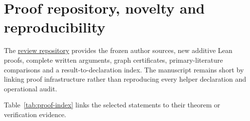 \documentclass[smallextended]{svjour3}
\begin{document}
\section{Proof repository, novelty and
reproducibility}\label{proof-repository-novelty-and-reproducibility}

The
\href{https://github.com/alejandrozu/openmath-2026-judging/tree/70c5ec3107658182f22c207d4c50f53f9cb3e602/robert-review-2026-10-07}{review
repository} provides the frozen author sources, new additive Lean
proofs, complete written arguments, graph certificates,
primary-literature comparisons and a result-to-declaration index. The
manuscript remains short by linking proof infrastructure rather than
reproducing every helper declaration and operational audit.

Table~\ref{tab:proof-index} links the selected statements to their theorem or verification evidence.
\end{document}
